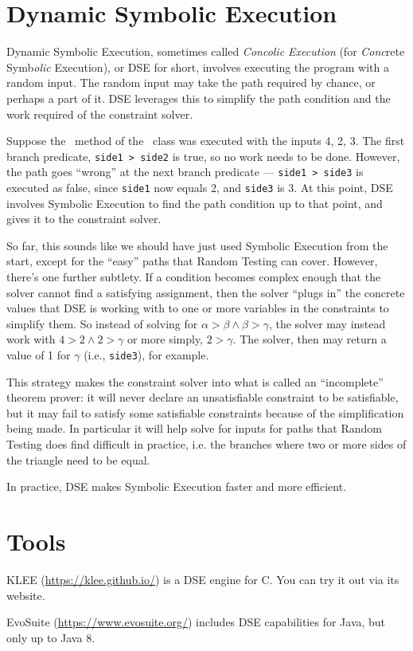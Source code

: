 \section{Dynamic Symbolic Execution}

Dynamic Symbolic Execution, sometimes called {\it Concolic Execution} (for {\it
Conc}rete Symb{\it olic} Execution), or DSE for short, involves executing the
program with a random input. The random input may take the path required by
chance, or perhaps a part of it. DSE leverages this to simplify the
path condition and the work required of the constraint solver. 

Suppose the \classifymethod~method of the \triangleclass~class was executed with
the inputs 4, 2, 3. The first branch predicate, {\tt side1 > side2} is true, so
no work needs to be done. However, the path goes ``wrong'' at the next branch
predicate --- {\tt side1 > side3} is executed as false, since {\tt side1} now
equals 2, and {\tt side3} is 3. At this point, DSE involves Symbolic Execution
to find the path condition up to that point, and gives it to the constraint
solver. 

So far, this sounds like we should have just used Symbolic Execution from the
start, except for the ``easy'' paths that Random Testing can cover. However,
there’s one further subtlety. If a condition becomes complex enough that the
solver cannot find a satisfying assignment, then the solver ``plugs in'' the
concrete values that DSE is working with to one or more variables in the
constraints to simplify them. So instead of solving for $\alpha > \beta \wedge
\beta > \gamma$, the solver may instead work with $4 > 2 \wedge 2 > \gamma$ or
more simply, $2 > \gamma$. The solver, then may return a value of 1 for $\gamma$
(i.e., {\tt side3}), for example.

This strategy makes the constraint solver into what is called an ``incomplete''
theorem prover: it will never declare an unsatisfiable constraint to be
satisfiable, but it may fail to satisfy some satisfiable constraints because of
the simplification being made. In particular it will help solve for inputs for
paths that Random Testing does find difficult in practice, i.e. the branches
where two or more sides of the triangle need to be equal.

In practice, DSE makes Symbolic Execution faster and more efficient. 

\section{Tools}

KLEE (\url{https://klee.github.io/}) is a DSE engine for C. You can try it out
via its website.

EvoSuite (\url{https://www.evosuite.org/}) includes DSE capabilities for Java,
but only up to Java 8.


